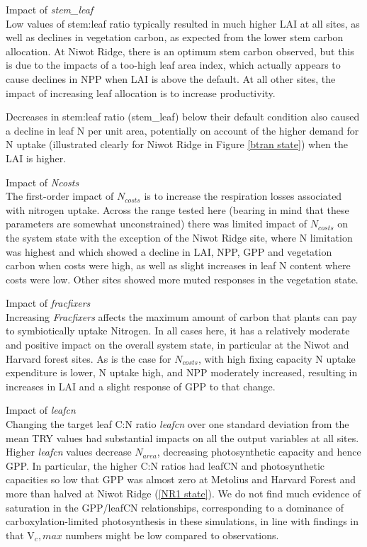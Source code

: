 \documentclass[draft,linenumbers]{agujournal}
\begin{document}
Impact of \emph{stem\_leaf}\\
Low values of stem:leaf ratio typically resulted in much higher LAI at all sites, as well as declines in vegetation carbon, as expected from the lower stem carbon allocation. At Niwot Ridge, there is an optimum stem carbon observed, but this is due to the impacts of a too-high leaf area index, which actually appears to cause declines in NPP when LAI is above the default. At all other sites, the impact of increasing leaf allocation is to increase productivity. 

Decreases in stem:leaf ratio (stem\_leaf) below their default condition also caused a decline in leaf N per unit area, potentially on account of the higher demand for N uptake (illustrated clearly for Niwot Ridge in Figure \ref{btran state}) when the LAI is higher. 

Impact of \emph{Ncosts}\\
The first-order impact of $N_{costs}$ is to increase the respiration losses associated with nitrogen uptake.  Across the range tested here (bearing in mind that these parameters are somewhat unconstrained) there was limited impact of $N_{costs}$ on the system state with the exception of the Niwot Ridge site, where N limitation was highest and which showed a decline in LAI, NPP, GPP and vegetation carbon when costs were high, as well as slight increases in leaf N content where costs were low. Other sites showed more muted responses in the vegetation state. 

Impact of \emph{fracfixers}\\
Increasing \emph{Fracfixers} affects the maximum amount of carbon that plants can pay to symbiotically uptake Nitrogen. In all cases here, it has a relatively moderate and positive impact on the overall system state, in particular at the Niwot and Harvard forest sites. As is the case for $N_{costs}$, with high fixing capacity N uptake expenditure is lower, N uptake high, and NPP moderately increased, resulting in increases in LAI and a slight response of GPP to that change. 

Impact of \emph{leafcn}\\
Changing the target leaf C:N ratio \emph{leafcn} over one standard deviation from the mean TRY values had substantial impacts on all the output variables at all sites. Higher \emph{leafcn} values decrease $N_{area}$, decreasing photosynthetic capacity and hence GPP.  In particular, the higher C:N ratios had leafCN and photosynthetic capacities so low that GPP was almost zero at Metolius and Harvard Forest and more than halved at Niwot Ridge (\ref{NR1 state}).    We do not find much evidence of saturation in the GPP/leafCN relationships, corresponding to a dominance of carboxylation-limited photosynthesis in these simulations, in line with findings in \cite{lawrence} that V${_c,max}$ numbers might be low compared to observations. 
\end{document}
